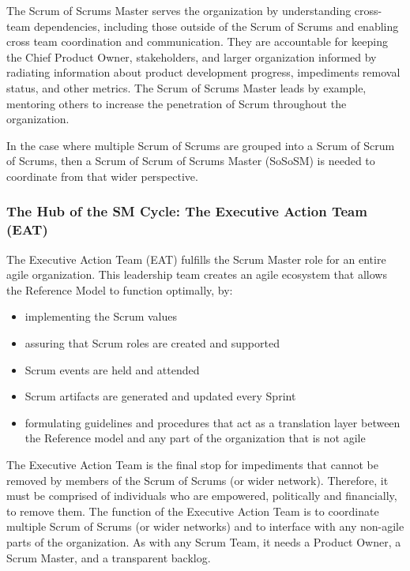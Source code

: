 \documentclass[12pt,a4paper,parskip=full]{scrartcl}
\begin{document}
The Scrum of Scrums Master serves the organization by understanding
cross-team dependencies, including those outside of the Scrum of Scrums
and enabling cross team coordination and communication. They are
accountable for keeping the Chief Product Owner, stakeholders, and
larger organization informed by radiating information about product
development progress, impediments removal status, and other metrics. The
Scrum of Scrums Master leads by example, mentoring others to increase
the penetration of Scrum throughout the organization.

In the case where multiple Scrum of Scrums are grouped into a Scrum of
Scrum of Scrums, then a Scrum of Scrum of Scrums Master (SoSoSM) is
needed to coordinate from that wider perspective.

\subsubsection{The Hub of the SM Cycle: The Executive Action Team
(EAT)}\label{the-hub-of-the-sm-cycle}

The Executive Action Team (EAT) fulfills the Scrum Master role for an
entire agile organization. This leadership team creates an agile
ecosystem that allows the Reference Model to function optimally, by:

\begin{itemize}
\itemsep1pt\parskip0pt
\item
  implementing the Scrum values
\item
  assuring that Scrum roles are created and supported
\item
  Scrum events are held and attended
\item
  Scrum artifacts are generated and updated every Sprint
\item
  formulating guidelines and procedures that act as a translation layer
  between the Reference model and any part of the organization that is
  not agile
\end{itemize}

The Executive Action Team is the final stop for impediments that cannot
be removed by members of the Scrum of Scrums (or wider network).
Therefore, it must be comprised of individuals who are empowered,
politically and financially, to remove them. The function of the
Executive Action Team is to coordinate multiple Scrum of Scrums (or
wider networks) and to interface with any non-agile parts of the
organization. As with any Scrum Team, it needs a Product Owner, a Scrum
Master, and a transparent backlog.
\end{document}
